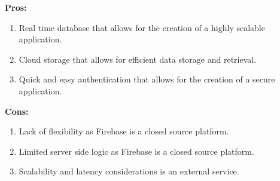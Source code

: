 \documentclass[11pt,a4paper]{article}
\begin{document}
\textbf{Pros:}
\begin{enumerate}[label*=\arabic*.]
	\item[\textbullet] Real time database that allows for the creation of a highly scalable application.
	\item[\textbullet] Cloud storage that allows for efficient data storage and retrieval.
	\item[\textbullet] Quick and easy authentication that allows for the creation of a secure application.
\end{enumerate}

\textbf{Cons:}
\begin{enumerate}[label*=\arabic*.]
	\item[\textbullet] Lack of flexibility as Firebase is a closed source platform.
	\item[\textbullet] Limited server side logic as Firebase is a closed source platform.
	\item[\textbullet] Scalability and latency considerations is an external service.
\end{enumerate}
\end{document}
